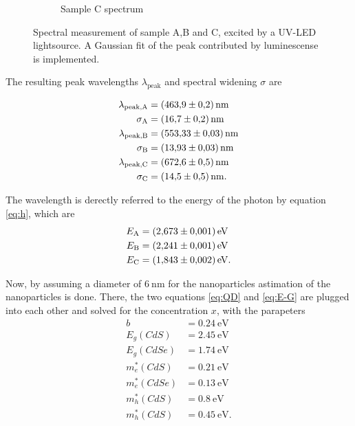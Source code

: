 \begin{figure}
\begin{subfigure}{.3\textwidth}
  \caption{Sample C spectrum}
    \label{fig:Samp_C_D}
\end{subfigure}
\caption{Spectral measurement of sample A,B and C, excited by a UV-LED lightsource. A Gaussian fit of the peak contributed by luminescense is implemented.}
\end{figure}

The resulting peak wavelengths $\lambda_\text{peak}$ and spectral widening $\sigma$ are

\begin{align*}
    \lambda_\text{peak,A} &= \SI{463.9 \pm 0.2}{\nano\meter} \\
    \sigma_\text{A} &= \SI{16.7 \pm 0.2}{\nano\meter} \\
    \lambda_\text{peak,B} &= \SI{553.33 \pm 0.03}{\nano\meter} \\
    \sigma_\text{B} &= \SI{13.93 \pm 0.03}{\nano\meter} \\
    \lambda_\text{peak,C} &= \SI{672.6 \pm 0.5}{\nano\meter} \\
    \sigma_\text{C} &= \SI{14.5 \pm 0.5}{\nano\meter}. \\
\end{align*}

The wavelength is derectly referred to the energy of the photon by equation \ref{eq:h}, which are 
\begin{align*}
    E_\text{A} &= \SI{2.673 \pm 0.001}{\eV} \\
    E_\text{B} &= \SI{2.241 \pm 0.001}{\eV} \\
    E_\text{C} &= \SI{1.843 \pm 0.002}{\eV}. \\
\end{align*}

Now, by assuming a diameter of $\SI{6}{\nano\meter}$ for the nanoparticles astimation of the nanoparticles is done.
There, the two equations \ref{eq:QD} and \ref{eq:E-G} are plugged into each other and solved for the concentration $x$, with the parapeters
\begin{align*}
    b          &= \SI{0.24}{\eV}\\
    E_g(CdS)   &= \SI{2.45}{\eV}\\
    E_g(CdSe)  &= \SI{1.74}{\eV}\\
    m^*_e(CdS) &= \SI{0.21}{\eV}\\
    m^*_e(CdSe)&= \SI{0.13}{\eV}\\
    m^*_h(CdS) &= \SI{0.8}{\eV}\\
    m^*_h(CdS) &= \SI{0.45}{\eV}.\\
\end{align*}\cite{instruction}

